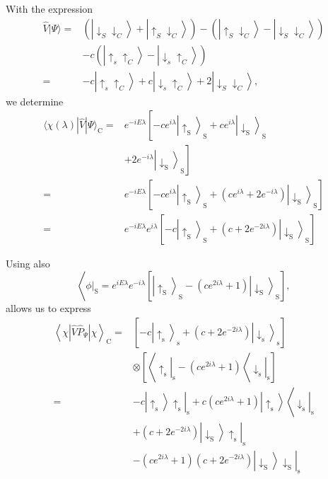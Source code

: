 With the expression
$$
\begin{aligned}
\hat{V}|\Psi\rangle= & \left(\left|\downarrow_S \downarrow_C\right\rangle+\left|\uparrow_S \downarrow_C\right\rangle\right)-\left(\left|\uparrow_S \downarrow_C\right\rangle-\left|\downarrow_S \downarrow_C\right\rangle\right) \\
& -c\left(\left|\uparrow_s \uparrow_C\right\rangle-\left|\downarrow_s \uparrow_C\right\rangle\right) \\
= & -c\left|\uparrow_s \uparrow_C\right\rangle+c\left|\downarrow_s \uparrow_C\right\rangle+2\left|\downarrow_S \downarrow_C\right\rangle,
\end{aligned}
$$
we determine
$$
\begin{aligned}
\langle\chi(\lambda)|\hat{V}| \Psi\rangle_{\mathrm{C}}= & e^{-i E \lambda}\left[-c e^{i \lambda}\left|\uparrow_{\mathrm{S}}\right\rangle_{\mathrm{S}}+c e^{i \lambda}\left|\downarrow_{\mathrm{S}}\right\rangle_{\mathrm{S}}\right. \\
& \left.+2 e^{-i \lambda}\left|\downarrow_{\mathrm{S}}\right\rangle_{\mathrm{S}}\right] \\
= & e^{-i E \lambda}\left[-c e^{i \lambda}\left|\uparrow_{\mathrm{S}}\right\rangle_{\mathrm{S}}+\left(c e^{i \lambda}+2 e^{-i \lambda}\right)\left|\downarrow_{\mathrm{S}}\right\rangle_{\mathrm{S}}\right] \\
= & e^{-i E \lambda} e^{i \lambda}\left[-c\left|\uparrow_{\mathrm{S}}\right\rangle_{\mathrm{S}}+\left(c+2 e^{-2 i \lambda}\right)\left|\downarrow_{\mathrm{S}}\right\rangle_{\mathrm{S}}\right]
\end{aligned}
$$

Using also
$$
\left\langle\left.\phi\right|_{\mathrm{S}}=e^{i E \lambda} e^{-i \lambda}\left[\left|\uparrow_{\mathrm{S}}\right\rangle_{\mathrm{S}}-\left(c e^{2 i \lambda}+1\right)\left|\downarrow_{\mathrm{S}}\right\rangle_{\mathrm{S}}\right],\right.
$$
allows us to express
$$
\begin{aligned}
\left\langle\chi\left|\hat{V} \hat{P}_{\Psi}\right| \chi\right\rangle_{\mathrm{C}}= & {\left[-c\left|\uparrow_{\mathrm{s}}\right\rangle_{\mathrm{s}}+\left(c+2 e^{-2 i \lambda}\right)\left|\downarrow_{\mathrm{s}}\right\rangle_{\mathrm{s}}\right] } \\
& \otimes\left[\left\langle\left.\uparrow_{\mathrm{s}}\right|_{\mathrm{s}}-\left(c e^{2 i \lambda}+1\right)\left\langle\left.\downarrow_{\mathrm{s}}\right|_{\mathrm{s}}\right]\right.\right. \\
= & -\left.c\left|\uparrow_{\mathrm{s}}\right\rangle \uparrow_{\mathrm{s}}\right|_{\mathrm{s}}+c\left(c e^{2 i \lambda}+1\right)\left|\uparrow_{\mathrm{s}}\right\rangle\left\langle\left.\downarrow_{\mathrm{s}}\right|_{\mathrm{s}}\right. \\
& +\left.\left(c+2 e^{-2 i \lambda}\right)\left|\downarrow_{\mathrm{S}}\right\rangle \uparrow_{\mathrm{s}}\right|_{\mathrm{s}} \\
& -\left.\left(c e^{2 i \lambda}+1\right)\left(c+2 e^{-2 i \lambda}\right)\left|\downarrow_{\mathrm{S}}\right\rangle \downarrow_{\mathrm{S}}\right|_{\mathrm{s}}
\end{aligned}
$$

